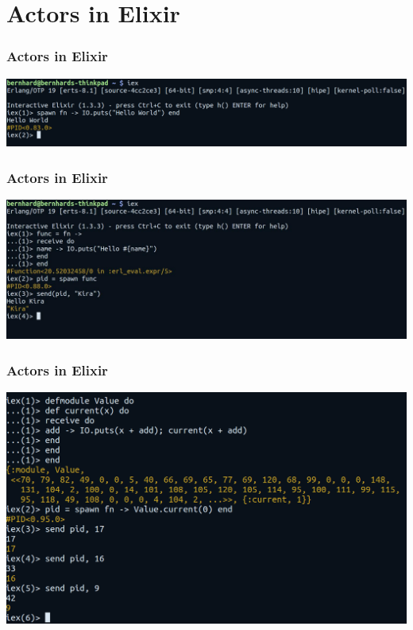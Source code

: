 \documentclass{beamer}
\begin{document}

\section{Actors in Elixir}


\begin{frame}
\frametitle{Actors in Elixir}
\includegraphics[width=1.2\linewidth]{./hello_elixir.jpg}
\end{frame}


\begin{frame}
\frametitle{Actors in Elixir}
\includegraphics[width=1.2\linewidth]{./elixir_hello_kira.jpg}
\end{frame}


\begin{frame}
\frametitle{Actors in Elixir}
\includegraphics[width=1.15\linewidth]{./elixir_state.png}
\end{frame}
\end{document}
